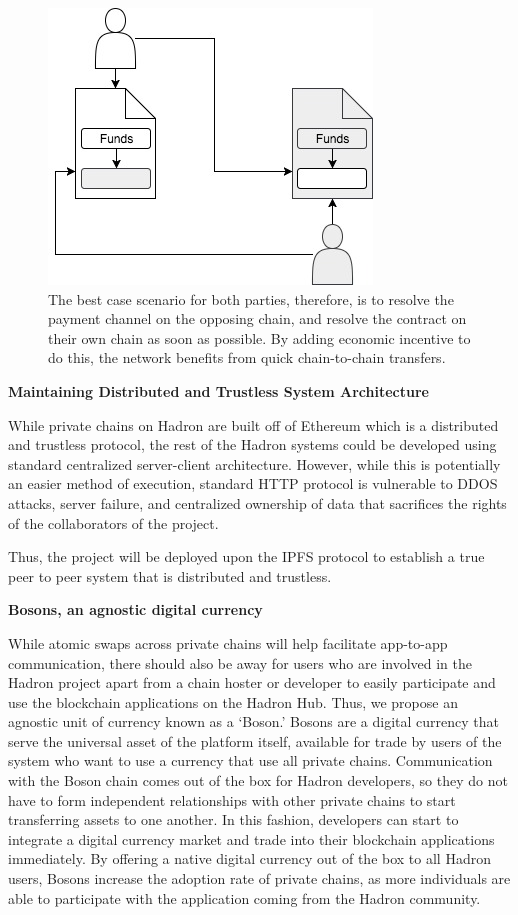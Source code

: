 \documentclass{article}
\begin{document}
\begin{figure}[htbp!]
\centering
\includegraphics[scale=0.5]{fig6.jpg}
\caption{The best case scenario for both parties, therefore, is to resolve the payment channel on the opposing chain, and resolve the contract on their own chain as soon as possible. By adding economic incentive to do this, the network benefits from quick chain-to-chain transfers.}
\end{figure}


\begin{center}
\textbf{Maintaining Distributed and Trustless System Architecture}
\end{center}

While private chains on Hadron are built off of Ethereum which is a distributed and trustless protocol, the rest of the Hadron systems could be developed using standard centralized server-client architecture. However, while this is potentially an easier method of execution, standard HTTP protocol is vulnerable to DDOS attacks, server failure, and centralized ownership of data that sacrifices the rights of the collaborators of the project.

Thus, the project will be deployed upon the IPFS protocol to establish a true peer to peer system that is distributed and trustless.

\begin{center}
\textbf{Bosons, an agnostic digital currency}
\end{center}

While atomic swaps across private chains will help facilitate app-to-app communication, there should also be away for users who are involved in the Hadron project apart from a chain hoster or developer to easily participate and use the blockchain applications on the Hadron Hub. Thus, we propose an agnostic unit of currency known as a ‘Boson.’ Bosons are a digital currency that serve the universal asset of the platform itself, available for trade by users of the system who want to use a currency that use all private chains. Communication with the Boson chain comes out of the box for Hadron developers, so they do not have to form independent relationships with other private chains to start transferring assets to one another. In this fashion, developers can start to integrate a digital currency market and trade into their blockchain applications immediately. By offering a native digital currency out of the box to all Hadron users, Bosons increase the adoption rate of private chains, as more individuals are able to participate with the application coming from the Hadron community.
\end{document}
